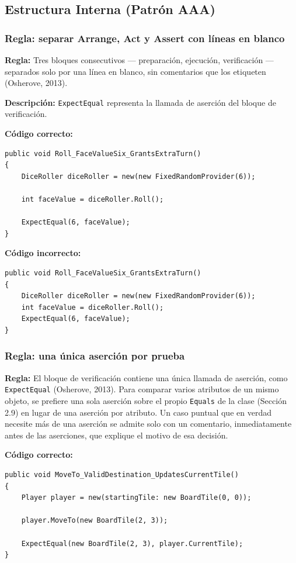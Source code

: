 \subsection{Estructura Interna (Patrón AAA)}

\subsubsection{Regla: separar Arrange, Act y Assert con líneas en blanco}

\textbf{Regla:} Tres bloques consecutivos --- preparación, ejecución, verificación --- separados solo por una línea en blanco, sin comentarios que los etiqueten (Osherove, 2013).

\textbf{Descripción:} \texttt{ExpectEqual} representa la llamada de aserción del bloque de verificación.

\textbf{Código correcto:}
\begin{lstlisting}[style=csharpstyle]
public void Roll_FaceValueSix_GrantsExtraTurn()
{
    DiceRoller diceRoller = new(new FixedRandomProvider(6));

    int faceValue = diceRoller.Roll();

    ExpectEqual(6, faceValue);
}
\end{lstlisting}

\textbf{Código incorrecto:}
\begin{lstlisting}[style=csharpstyle]
public void Roll_FaceValueSix_GrantsExtraTurn()
{
    DiceRoller diceRoller = new(new FixedRandomProvider(6));
    int faceValue = diceRoller.Roll();
    ExpectEqual(6, faceValue);
}
\end{lstlisting}

\subsubsection{Regla: una única aserción por prueba}

\textbf{Regla:} El bloque de verificación contiene una única llamada de aserción, como \texttt{ExpectEqual} (Osherove, 2013). Para comparar varios atributos de un mismo objeto, se prefiere una sola aserción sobre el propio \texttt{Equals} de la clase (Sección 2.9) en lugar de una aserción por atributo. Un caso puntual que en verdad necesite más de una aserción se admite solo con un comentario, inmediatamente antes de las aserciones, que explique el motivo de esa decisión.

\textbf{Código correcto:}
\begin{lstlisting}[style=csharpstyle]
public void MoveTo_ValidDestination_UpdatesCurrentTile()
{
    Player player = new(startingTile: new BoardTile(0, 0));

    player.MoveTo(new BoardTile(2, 3));

    ExpectEqual(new BoardTile(2, 3), player.CurrentTile);
}
\end{lstlisting}

